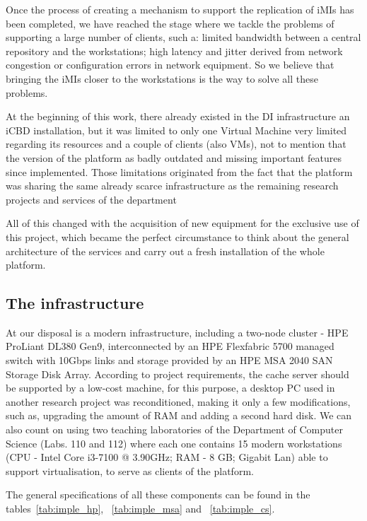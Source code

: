 Once the process of creating a mechanism to support the replication of iMIs has been completed, we have reached the stage where we tackle the problems of supporting a large number of clients, such a: limited bandwidth between a central repository and the workstations; high latency and jitter derived from network congestion or configuration errors in network equipment. So we believe that bringing the iMIs closer to the workstations is the way to solve all these problems.

At the beginning of this work, there already existed in the DI infrastructure an iCBD installation, but it was limited to only one Virtual Machine very limited regarding its resources and a couple of clients (also VMs), not to mention that the version of the platform as badly outdated and missing important features since implemented. Those limitations originated from the fact that the platform was sharing the same already scarce infrastructure as the remaining research projects and services of the department

All of this changed with the acquisition of new equipment for the exclusive use of this project, which became the perfect circumstance to think about the general architecture of the services and carry out a fresh installation of the whole platform.


\subsection{The infrastructure}
\label{sub:impl_infrastructure}

At our disposal is a modern infrastructure, including a two-node cluster - HPE ProLiant DL380 Gen9, interconnected by an HPE Flexfabric 5700 managed switch with 10Gbps links and storage provided by an HPE MSA 2040 SAN Storage Disk Array.
According to project requirements, the cache server should be supported by a low-cost machine, for this purpose, a desktop PC used in another research project was reconditioned, making it only a few modifications, such as, upgrading the amount of RAM and adding a second hard disk.
We can also count on using two teaching laboratories of the Department of Computer Science (Labs. 110 and 112) where each one contains 15 modern workstations (CPU - Intel Core i3-7100 @ 3.90GHz; RAM - 8 GB; Gigabit Lan) able to support virtualisation, to serve as clients of the platform.

The general specifications of all these components can be found in the tables~\ref{tab:imple_hp}, ~\ref{tab:imple_msa} and ~\ref{tab:imple_cs}.


